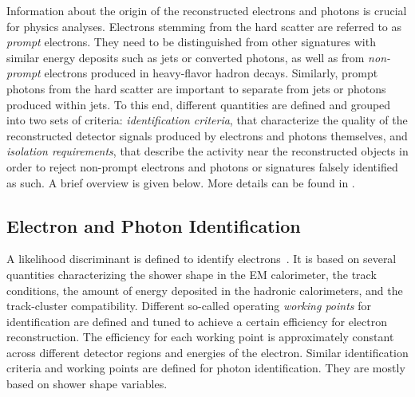 Information about the origin of the reconstructed electrons and photons is crucial for physics analyses.
Electrons stemming from the hard scatter are referred to as \emph{prompt} electrons. They need to be distinguished from other signatures with similar energy deposits such as jets or converted photons, as well as from \emph{non-prompt} electrons produced in heavy-flavor hadron decays.
Similarly, prompt photons from the hard scatter are important to separate from jets or photons produced within jets.
To this end, different quantities are defined and grouped into two sets of criteria: \emph{identification criteria}, that characterize the quality of the reconstructed detector signals produced by electrons and photons themselves, and \emph{isolation requirements}, that describe the activity near the reconstructed objects in order to reject non-prompt electrons and photons or signatures falsely identified as such. A brief overview is given below. More details can be found in .

\subsection{Electron and Photon Identification}
A likelihood discriminant is defined to identify electrons~\cite{EGAM-2018-01}. It is based on several quantities characterizing the shower shape in the EM calorimeter, the track conditions, the amount of energy deposited in the hadronic calorimeters, and the track-cluster compatibility. Different so-called operating \emph{working points} for identification are defined and tuned to achieve a certain efficiency for electron reconstruction. The efficiency for each working point is approximately constant across different detector regions and energies of the electron.
Similar identification criteria and working points are defined for photon identification. They are mostly based on shower shape variables.


